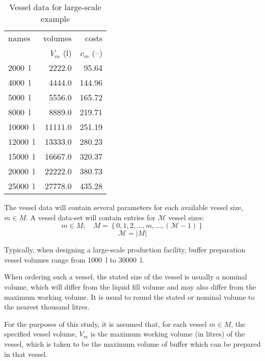 \begin{table}[h!]
    \centering
    \caption{Vessel data for large-scale example}
    \label{tbl.vessel}
    \begin{tabular}{l | r | r}
        names & volumes & costs\\
        & $V_{m}$ (l) & $c_{m}$ (--)\\\hline
        \SI{2000}{\litre} & \SI{2222.0}{} & \SI{95.64}{}\\
        \SI{4000}{\litre} & \SI{4444.0}{} & \SI{144.96}{}\\
        \SI{5000}{\litre} & \SI{5556.0}{} & \SI{165.72}{}\\
        \SI{8000}{\litre} & \SI{8889.0}{} & \SI{219.71}{}\\
        \SI{10000}{\litre} & \SI{11111.0}{} & \SI{251.19}{}\\
        \SI{12000}{\litre} & \SI{13333.0}{} & \SI{280.23}{}\\
        \SI{15000}{\litre} & \SI{16667.0}{} & \SI{320.37}{}\\
        \SI{20000}{\litre} & \SI{22222.0}{} & \SI{380.73}{}\\
        \SI{25000}{\litre} & \SI{27778.0}{} & \SI{435.28}{}\\
    \end{tabular}
\end{table}

The vessel data will contain several parameters for each available vessel size,
$m \in M$.
A vessel data-set will contain entries for $\mathcal{M}$ vessel sizes:
\begin{equation}
    m \in M; \quad M = \left\{ 0, 1, 2, \ldots, m, \ldots, \left(
    \mathcal{M} - 1 \right) \right\}
\end{equation}
\begin{equation}
    \mathcal{M} = |M|
\end{equation}

Typically, when designing a large-scale production facility, buffer preparation
vessel volumes range from \SI{1000}{\litre} to \SI{30000}{\litre}.

When ordering such a vessel, the stated size of the vessel is usually a nominal
volume, which will differ from the liquid fill volume and may also differ from
the maximum working volume.
It is usual to round the stated or nominal volume to the nearest thousand
litres.

For the purposes of this study, it is assumed that, for each vessel $m \in M$,
the specified vessel volume, $V_{m}$ is the maximum working volume (in litres)
of the vessel, which is taken to be the maximum volume of buffer which can be
prepared in that vessel.

